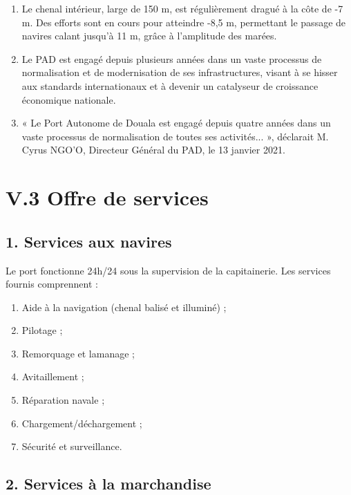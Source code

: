 \documentclass[a4paper,12pt,openany]{report}
\begin{document}
	\begin{enumerate}
		\item Le chenal intérieur, large de 150 m, est régulièrement dragué à la côte de -7 m. Des efforts sont en cours pour atteindre -8,5 m, permettant le passage de navires calant jusqu’à 11 m, grâce à l’amplitude des marées.
		
		\item Le PAD est engagé depuis plusieurs années dans un vaste processus de normalisation et de modernisation de ses infrastructures, visant à se hisser aux standards internationaux et à devenir un catalyseur de croissance économique nationale.
		
		\item « Le Port Autonome de Douala est engagé depuis quatre années dans un vaste processus de normalisation de toutes ses activités... », déclarait M. Cyrus NGO’O, Directeur Général du PAD, le 13 janvier 2021.
	\end{enumerate}
	
	\section*{V.3 Offre de services}
	
	\subsection*{1. Services aux navires}
	
	Le port fonctionne 24h/24 sous la supervision de la capitainerie. Les services fournis comprennent :
	\begin{enumerate}
		\item Aide à la navigation (chenal balisé et illuminé) ;
		\item Pilotage ;
		\item Remorquage et lamanage ;
		\item Avitaillement ;
		\item Réparation navale ;
		\item Chargement/déchargement ;
		\item Sécurité et surveillance.
	\end{enumerate}
	
	\subsection*{2. Services à la marchandise}
	
\end{document}

